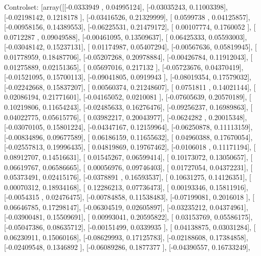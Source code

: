 \documentclass{article}
\begin{document}
Controlset: [array([[-0.0333949 ,  0.04995124],
       [-0.03035243,  0.11003398],
       [-0.02198142,  0.1218178 ],
       [-0.03416526,  0.21329999],
       [ 0.0599738 ,  0.04125857],
       [-0.00958156,  0.14389553],
       [-0.06225531,  0.21479172],
       [ 0.00107774,  0.1760052 ],
       [ 0.0712287 ,  0.09049588],
       [-0.00461095,  0.13509637],
       [ 0.06425333,  0.05593003],
       [-0.03048142,  0.15237131],
       [ 0.01174987,  0.05407294],
       [-0.00567636,  0.05819945],
       [ 0.01778959,  0.18487706],
       [-0.05207268,  0.20978884],
       [-0.00426784,  0.11912043],
       [ 0.01275889,  0.02151365],
       [ 0.05697016,  0.217132  ],
       [-0.05723676,  0.04370419],
       [-0.01521095,  0.15700113],
       [-0.09041805,  0.0919943 ],
       [-0.08019354,  0.17579032],
       [-0.02242668,  0.15837207],
       [ 0.00560374,  0.21248607],
       [ 0.0751811 ,  0.14021144],
       [ 0.02086194,  0.21771601],
       [-0.04165052,  0.0210081 ],
       [-0.07605639,  0.20570189],
       [ 0.10219806,  0.11654243],
       [-0.02485633,  0.16276476],
       [-0.09256237,  0.16989863],
       [ 0.04022775,  0.05615776],
       [ 0.03982217,  0.20043977],
       [-0.0624282 ,  0.20015348],
       [-0.03070105,  0.15801224],
       [-0.04347167,  0.12159964],
       [-0.06250878,  0.11113159],
       [-0.00834896,  0.09677589],
       [ 0.06186159,  0.11655632],
       [ 0.04960388,  0.17670054],
       [-0.02557813,  0.19996435],
       [ 0.04819869,  0.19767462],
       [-0.0106018 ,  0.11171194],
       [ 0.08912707,  0.14516631],
       [ 0.01545267,  0.06599414],
       [ 0.10173072,  0.13050657],
       [ 0.06619767,  0.06586665],
       [ 0.00056976,  0.09746403],
       [ 0.01727054,  0.04372231],
       [ 0.05373491,  0.02415176],
       [-0.0378891 ,  0.16593537],
       [ 0.10631275,  0.14126351],
       [ 0.00070312,  0.18934168],
       [ 0.12286213,  0.07736473],
       [ 0.00193346,  0.15811916],
       [-0.0054315 ,  0.02476475],
       [-0.00784858,  0.11538483],
       [-0.07199081,  0.2016018 ],
       [ 0.06646785,  0.17298147],
       [-0.06304519,  0.02605897],
       [-0.03235212,  0.04374961],
       [-0.03900481,  0.15509691],
       [ 0.00993041,  0.20595822],
       [ 0.03153769,  0.05586175],
       [-0.05047386,  0.08635712],
       [-0.00151499,  0.0339935 ],
       [ 0.04138875,  0.03031284],
       [ 0.06230911,  0.15060168],
       [-0.08629993,  0.17125783],
       [-0.02188608,  0.17384858],
       [-0.02409548,  0.1346892 ],
       [-0.06089286,  0.1877377 ],
       [-0.04390557,  0.16733249],
\end{document}
